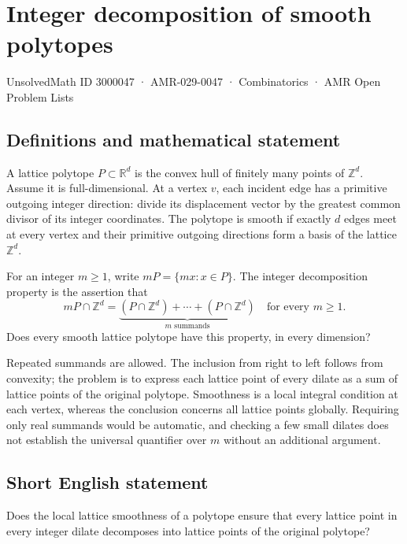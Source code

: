 \documentclass[11pt,a4paper]{article}
\begin{document}
\section*{Integer decomposition of smooth polytopes}\label{3000047}
{\small UnsolvedMath ID 3000047 · AMR-029-0047 · Combinatorics · AMR Open Problem Lists}
\subsection{Definitions and mathematical statement}
A lattice polytope $P\subset\mathbb R^d$ is the convex hull of finitely
many points of $\mathbb Z^d$. Assume it is full-dimensional.
At a vertex $v$, each incident edge has a primitive outgoing integer
direction: divide its displacement vector by the greatest common
divisor of its integer coordinates. The polytope is smooth if exactly
$d$ edges meet at every vertex and their primitive outgoing directions
form a basis of the lattice $\mathbb Z^d$.

For an integer $m\ge1$, write $mP=\{mx:x\in P\}$.
The integer decomposition property is the assertion that
\[
                  mP\cap\mathbb Z^d
                   =\underbrace{(P\cap\mathbb Z^d)+\cdots+
                                  (P\cap\mathbb Z^d)}_{m\text{ summands}}
                                      \quad\text{for every }m\ge1.
\]
Does every smooth lattice polytope have this property, in every dimension?

Repeated summands are allowed. The inclusion from right to left follows
from convexity; the problem is to express each lattice point of every
dilate as a sum of lattice points of the original polytope. Smoothness
is a local integral condition at each vertex, whereas the conclusion
concerns all lattice points globally. Requiring only real summands
would be automatic, and checking a few small dilates does not establish
the universal quantifier over $m$ without an additional argument.
\subsection{Short English statement}
Does the local lattice smoothness of a polytope ensure that every
lattice point in every integer dilate decomposes into lattice points of the original polytope?
\end{document}
